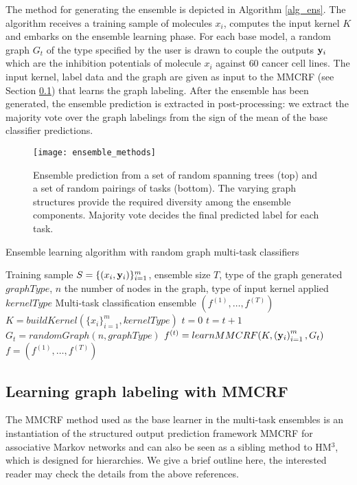 \documentclass[runningheads,a4paper]{llncs}
\newcommand{\yb}{{\bf y}}
\newcommand{\HMcubed}{HM$^3$}
\begin{document}
The method for generating the ensemble is depicted in  Algorithm \ref{alg_ens}. The algorithm receives a training sample of molecules $x_i$, computes the input kernel $K$ and embarks on the ensemble learning phase. For each base model, a random graph $G_t$ of the type specified by the user is drawn to couple the outputs $\yb_i$ which are the inhibition potentials of molecule $x_i$ against $60$ cancer cell lines.
The input kernel, label data and the graph are given as input to the MMCRF (see Section \ref{sec_model}) that learns the graph labeling. After the ensemble has been generated, the ensemble prediction is extracted in post-processing:  we extract the majority vote over the graph labelings from the sign of the mean of the base classifier predictions. 
\begin{figure}
\begin{center}
\texttt{[image: ensemble\_methods]}
\caption{Ensemble prediction from a set of random spanning trees (top) and a set of random pairings of tasks (bottom). The varying graph structures provide the
  required diversity among the ensemble components. Majority vote decides the final predicted label for each task.}
\label{ensemble_methods}
\end{center}
\end{figure}
\begin{algorithm}
\caption{Ensemble learning algorithm with random graph multi-task classifiers}
\label{alg_ens}
\begin{algorithmic}[1]
\REQUIRE Training sample $S = \lbrace (x_i,\yb_i)\rbrace_{i=1}^m$, ensemble size $T$, type of the graph generated $graphType$, $n$ the number of nodes in the graph,
type of input kernel applied $kernelType$
\ENSURE Multi-task classification ensemble $\left(f^{(1)},\dots,f^{(T)}\right)$
\STATE $K = buildKernel( \lbrace x_i \rbrace_{i=1}^m,kernelType)$
\STATE $t = 0$
\STATE $t = t+1$
\STATE $G_t = randomGraph(n,graphType)$
\STATE $f^{(t)} = learnMMCRF(K,\left(\yb_i\right)_{i=1}^m,G_t)$
\ENDWHILE
\RETURN $f = \left(f^{(1)},\dots,f^{(T)}\right)$
\end{algorithmic}
\end{algorithm}

\subsection{Learning graph labeling with MMCRF}
\label{sec_model}

The MMCRF method used as the base learner in the multi-task ensembles is an instantiation of the structured output prediction framework MMCRF \cite{rousu2007} for associative Markov networks and can also be seen as a sibling method to \HMcubed \cite{rousu2006kbl}, which is designed for hierarchies. We give a brief outline here, the interested reader may check the details from the above references.
\end{document}
